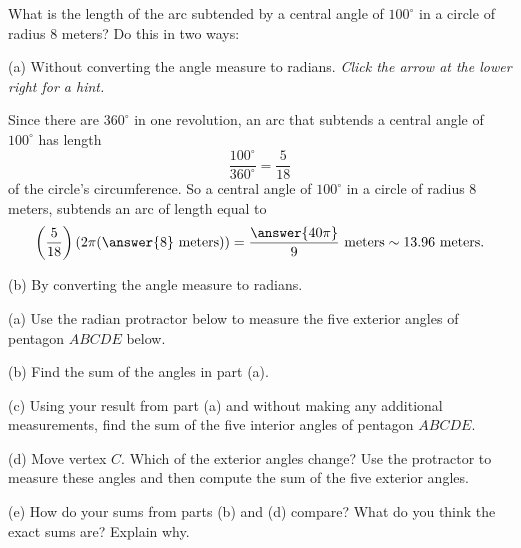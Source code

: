 \documentclass{ximera}
\begin{document}
\begin{question} \label{Q873:Radians}
What is the length of the arc subtended by a central angle of $100^\circ$ in a circle of radius $8$ meters? Do this in two ways:

(a) Without converting the angle measure to radians. \emph{Click the arrow at the lower right for a hint.}

\begin{expandable}
Since there are $360^\circ$ in one revolution, an arc that subtends a central angle of $100^\circ$ has length
\[
        \frac{100^\circ}{360^\circ} = \frac{5}{18}
\]
of the circle's circumference. So a central angle of $100^\circ$ in a circle of radius $8$ meters, subtends an arc of length equal to 
\[
    \left( \frac{5}{18} \right) (2\pi (\answer{8} \text{ meters})) = \frac{\answer{40\pi}}{9} \text{ meters} \sim 13.96 \text{ meters} .
\]
\end{expandable}

(b) By converting the angle measure to radians.
\end{question}



\begin{exploration}  \label{Q111:Radians}
(a) Use the radian protractor below to measure the five exterior angles of pentagon $ABCDE$ below.

(b) Find the sum of the angles in part (a).

(c) Using your result from part (a) and without making any additional measurements, find the sum of the five interior angles of pentagon $ABCDE$.

(d) Move vertex $C$. Which of the exterior angles change? Use the protractor to measure these angles and then compute the sum of the five exterior angles.

(e) How do your sums from parts (b) and (d) compare? What do you think the exact sums are? Explain why.


 
\begin{onlineOnly}
    \begin{center}
\end{center}
\end{onlineOnly}
\end{exploration}
\end{document}

